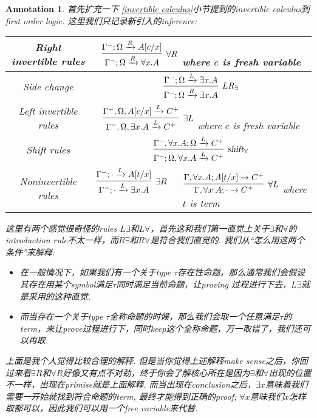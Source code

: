\documentclass{article}
\theoremstyle{plain}
\newtheorem{annotation}[theorem]{Annotation}
\theoremstyle{nonumberplain}
\begin{document}
\begin{annotation}
\rm 首先扩充一下 \ref{invertible calculus}小节提到的invertible calculus到first order logic. 这里我们只记录新引入的inference:
\begin{center}
\begin{tabular}{c|c}
Right invertible rules & $\infer[\forall R]{\Gamma^-;\Omega \xrightarrow{R} \forall x.A}{\Gamma^-;\Omega \xrightarrow{R} A[c/x]}$ where $c$ is fresh variable \\
\hline Side change & $\infer[LR_\exists]{\Gamma^-;\Omega \xrightarrow{R} \exists x.A}{\Gamma^-;\Omega \xrightarrow{L} \exists x.A}$ \\
\hline Left invertible rules & $\infer[\exists L]{\Gamma^-,\Omega,\exists x. A \xrightarrow{L} C^+}{\Gamma^-,\Omega,A[c/x] \xrightarrow{L} C^+}$ where $c$ is fresh variable \\
\hline Shift rules & $\infer[\textsl{shift}_\forall]{\Gamma^-; \Omega, \forall x. A \xrightarrow{L} C^+}{\Gamma^-,\forall x. A; \Omega \xrightarrow{L} C^+}$ \\
\hline Noninvertible rules & $\infer[\exists R]{\Gamma^-; \cdot \xrightarrow{L} \exists x.A}{\Gamma^-; \cdot \xrightarrow{L} A[t/x]} \quad\quad \infer[\forall L]{\Gamma, \forall x. A;\cdot \to C^+}{\Gamma, \forall x. A; A[t/x] \to C^+}$ where $t$ is term
\end{tabular}
\end{center}
这里有两个感觉很奇怪的rules $L \exists$和$L \forall$，首先这和我们第一直觉上关于$\exists$和$\forall$的introduction rule不太一样，而$R \exists$和$R \forall$是符合我们直觉的. 我们从“怎么用这两个条件”来解释:
\begin{itemize}
	\item 在一般情况下，如果我们有一个关于type $\tau$存在性命题，那么通常我们会假设其存在用某个symbol满足$\tau$同时满足当前命题，让proving 过程进行下去，$L \exists$就是采用的这种直觉.
	\item 而当存在一个关于type $\tau$全称命题的时候，那么我们会取一个任意满足$\tau$的term，来让prove过程进行下，同时keep这个全称命题，万一取错了，我们还可以再取. 
\end{itemize}
上面是我个人觉得比较合理的解释. 但是当你觉得上述解释make sense之后，你回过来看$ \exists R$和$\forall R$好像又有点不对劲，终于你会了解核心所在是因为$\exists$和$\forall$出现的位置不一样，出现在primise就是上面解释. 而当出现在conclusion之后，$\exists x$意味着我们需要一开始就找到符合命题的term, 最终才能得到正确的proof; $\forall x$意味我们$x$怎样取都可以，因此我们可以用一个free variable来代替. 
\end{annotation}
\end{document}
